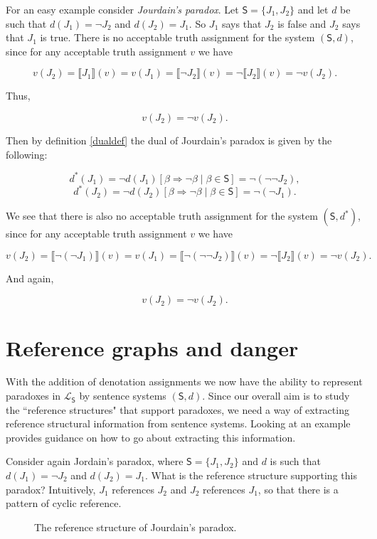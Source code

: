 \documentclass[12pt]{kluwer}
\theoremstyle{remark}
\newcommand{\prg}{\hspace{0.25in}}
\newcommand{\fancy}[1]{\mathcal{#1}}
\def\S{\textsf{S}}
\def\L{\fancy{L}}
\def\ll{\llbracket}
\def\rr{\rrbracket}
\begin{document}
\prg For an easy example consider \textit{Jourdain's paradox}. Let $\S = \{J_1, J_2\}$ and let $d$ be such that  $d(J_1) = \neg J_2$ and $d(J_2) = J_1$. So $J_1$ says that $J_2$ is false and $J_2$ says that $J_1$ is true. There is no acceptable truth assignment for the system $(\S, d)$, since for any acceptable truth assignment $v$ we have

\[
v(J_2) = \ll J_1 \rr(v) = v(J_1) = \ll\neg J_2\rr(v) = \neg \ll J_2 \rr (v)=\neg v(J_2).
\]

Thus,

\[v(J_2) = \neg v(J_2).\]

Then by definition \ref{dualdef} the dual of Jourdain's paradox is given by the following:

\[d^*(J_1) = \neg d(J_1)[\beta \Rightarrow \neg \beta \mid \beta \in \S] = \neg (\neg \neg J_2),\]
\[d^*(J_2) = \neg d(J_2)[\beta \Rightarrow \neg \beta \mid \beta \in \S] = \neg (\neg J_1).\]


We see that there is also no acceptable truth assignment for the system $(\S, d^*)$, since for any acceptable truth assignment $v$ we have

\[
v(J_2) = \ll \neg(\neg J_1) \rr(v) = v(J_1) = \ll\neg(\neg\neg J_2)\rr(v) = \neg \ll J_2 \rr (v)=\neg v(J_2).
\]

And again,

\[v(J_2) = \neg v(J_2).\]

\section{Reference graphs and danger}\label{sec2}

With the addition of denotation assignments we now have the ability to represent paradoxes in $\L_\S$ by sentence systems $(\S, d)$. Since our overall aim is to study the ``reference structures" that support paradoxes, we need a way of extracting reference structural information from sentence systems.  Looking at an example provides guidance on how to go about extracting this information.

\prg Consider again Jordain's paradox, where $\S = \{J_1, J_2\}$ and $d$ is such that  $d(J_1) = \neg J_2$ and $d(J_2) = J_1$. What is the reference structure supporting this paradox? Intuitively, $J_1$ references $J_2$ and $J_2$ references $J_1$, so that there is a pattern of cyclic reference.


\begin{figure}[h]
\centering




\caption{The reference structure of Jourdain's paradox.}
\end{figure}
\end{document}
